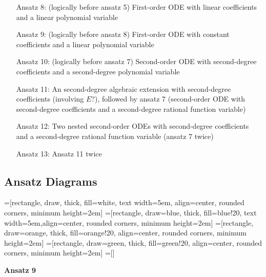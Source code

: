 \documentclass{article}
\def\coeff{\framebox(10,10){}}
\newcommand{\tikzmark}[1]{\tikz[overlay,remember picture] \node (#1) {};}
\begin{document}
\begin{itemize}
\item[Ansatz 8:] (logically before ansatz 5) First-order ODE with linear coefficients and a linear polynomial variable

\item[Ansatz 9:] (logically before ansatz 8) First-order ODE with constant coefficients and a linear polynomial variable

\item[Ansatz 10:] (logically before ansatz 7) Second-order ODE with second-degree coefficients and a second-degree polynomial variable

\item[Ansatz 11:] An second-degree algebraic extension with second-degree coefficients (involving $E$?),
followed by ansatz 7 (second-order ODE with second-degree coefficients and a second-degree rational function variable)

\item[Ansatz 12:] Two nested second-order ODEs with second-degree coefficients and a second-degree rational function variable (ansatz 7 twice)

\item[Ansatz 13:] Ansatz 11 twice

\end{itemize}

\subsection*{Ansatz Diagrams}

=[rectangle, draw, thick, fill=white, text width=5em, align=center, rounded corners, minimum height=2em]
=[rectangle, draw=blue, thick, fill=blue!20, text width=5em,align=center, rounded corners, minimum height=2em]
=[rectangle, draw=orange, thick, fill=orange!20, align=center, rounded corners, minimum height=2em]
=[rectangle, draw=green, thick, fill=green!20, align=center, rounded corners, minimum height=2em]
=[]

{\bf Ansatz 9}

\end{document}
